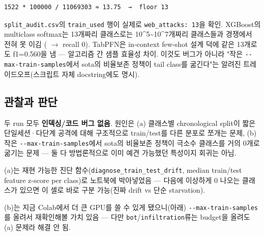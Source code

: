 \begin{Verbatim}[breaklines=true,breakanywhere=true,fontsize=\scriptsize]
1522 * 100000 / 11069303 ≈ 13.75  →  floor 13

\end{Verbatim}
\texttt{split\_\allowbreak{}\allowbreak{}au\allowbreak{}dit.\allowbreak{}csv}의 \texttt{train\_\allowbreak{}\allowbreak{}us\allowbreak{}ed} 행이 실제로 \texttt{web\_\allowbreak{}\allowbreak{}atta\allowbreak{}cks: 13}을 확인. XGBoost의 multiclass softmax는 13개짜리 클래스로는 10\textasciicircum{}5\textasciitilde{}10\textasciicircum{}7개짜리 클래스들과 경쟁에서 전혀 못 이김 ( \ensuremath{\rightarrow}  recall 0). TabPFN은 in-context few-shot 설계 덕에 같은 13개로도 f1=\allowbreak{}0.560을 냄 — 알고리즘 간 샘플 효율성 차이. 이것도 버그가 아니라 "작은 \texttt{-\allowbreak{}-\allowbreak{}max-\allowbreak{}tr\allowbreak{}ain-\allowbreak{}samp\allowbreak{}les}에서 sota의 비율보존 정책이 tail class를 굶긴다"는 알려진 트레이드오프(스크립트 자체 docstring에도 명시).

\subsection{관찰과 판단}
\par\noindent \textbullet\enspace 두 run 모두 \textbf{인덱싱/\allowbreak{}코드 버그 없음}. 원인은 (a) 클래스별 chronological split이 짧은 단일세션·다단계 공격에 대해 구조적으로 train/\allowbreak{}test를 다른 분포로 쪼개는 문제, (b) 작은 \texttt{-\allowbreak{}-\allowbreak{}max-\allowbreak{}tr\allowbreak{}ain-\allowbreak{}samp\allowbreak{}les}에서 sota의 비율보존 정책이 극소수 클래스를 거의 0개로 굶기는 문제 — 둘 다 방법론적으로 이미 예견 가능했던 특성이지 회귀는 아님.


\par\noindent \textbullet\enspace (a)는 재현 가능한 진단 함수(\texttt{diagnose\allowbreak{}\_\allowbreak{}\allowbreak{}train\_\allowbreak{}\allowbreak{}t\allowbreak{}est\_\allowbreak{}\allowbreak{}drif\allowbreak{}t}, median train/\allowbreak{}test feature z-score per class)로 노트북에 박아넣었음 — 다음에 이상하게 0 나오는 클래스가 있으면 이 셀로 바로 구분 가능(진짜 drift vs 단순 starvation).


\par\noindent \textbullet\enspace (b)는 지금 Colab에서 더 큰 GPU를 쓸 수 있게 됐으니(아래) \texttt{-\allowbreak{}-\allowbreak{}max-\allowbreak{}tr\allowbreak{}ain-\allowbreak{}samp\allowbreak{}les}를 올려서 재확인해볼 가치 있음 — 다만 \texttt{bot}/\allowbreak{}\texttt{infiltra\allowbreak{}tion}류는 budget을 올려도 (a) 문제라 해결 안 됨.


